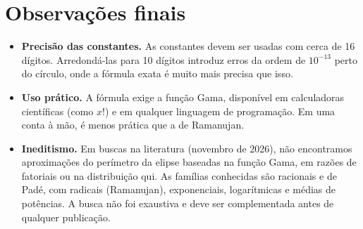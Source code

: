 \documentclass[11pt,a4paper]{article}
\theoremstyle{definition}
\theoremstyle{remark}
\begin{document}
\section{Observações finais}

\begin{itemize}
  \item \textbf{Precisão das constantes.} As constantes devem ser usadas com cerca de 16
  dígitos. Arredondá-las para 10 dígitos introduz erros da ordem de $10^{-13}$ perto
  do círculo, onde a fórmula exata é muito mais precisa que isso.
  \item \textbf{Uso prático.} A fórmula exige a função Gama, disponível em calculadoras
  científicas (como $x!$) e em qualquer linguagem de programação. Em uma conta à mão, é menos
  prática que a de Ramanujan.
  \item \textbf{Ineditismo.} Em buscas na literatura (novembro de 2026), não
  encontramos aproximações do perímetro da elipse baseadas na função Gama, em
  razões de fatoriais ou na distribuição qui. As famílias conhecidas são
  racionais e de Padé, com radicais (Ramanujan), exponenciais, logarítmicas e
  médias de potências. A busca não foi exaustiva e deve ser complementada antes
  de qualquer publicação.
\end{itemize}
\end{document}

